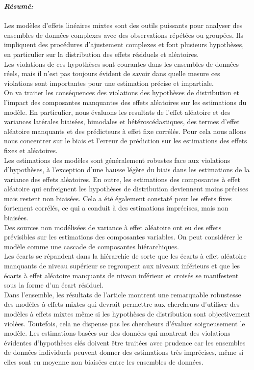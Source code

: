 \documentclass{article}
\begin{document}
\textbf{\textit{Résumé:}} \\  \\

Les modèles d'effets linéaires mixtes sont des outils puissants pour analyser des ensembles de données complexes avec des observations répétées ou groupées. Ils impliquent des procédures d'ajustement complexes et font plusieurs hypothèses, en particulier sur la distribution des effets résiduels et aléatoires. \\ 
 Les violations de ces hypothèses sont courantes dans les ensembles de données réels, mais il n'est pas toujours évident de savoir dans quelle mesure ces violations sont importantes pour une estimation précise et impartiale.\\
On va traiter les conséquences des violations des hypothèses de distribution et l'impact des composantes manquantes des effets aléatoires sur les estimations du modèle. En particulier, nous évaluons les resultats de l'effet aléatoire et des variances latérales biaisées, bimodales et hétéroscédastiques, des termes d'effet aléatoire manquants et des prédicteurs à effet fixe corrélés. Pour cela nous allons nous concentrer sur le biais et l'erreur de prédiction sur les estimations des effets fixes et aléatoires.\\ 

Les estimations des modèles sont généralement robustes face aux violations d'hypothèses, à l'exception d’une hausse légère du biais dans les estimations de la variance des effets aléatoires. En outre, les estimations des composantes à effet aléatoire qui enfreignent les hypothèses de distribution deviennent moins précises mais restent non biaisées. Cela a été également constaté pour les effets fixes fortement corrélés, ce qui a conduit à des estimations imprécises, mais non biaisées.\\

Des sources non modélisées de variance à effet aléatoire ont eu des effets prévisibles sur les estimations des composantes variables. On peut considérer le modèle comme une cascade de composantes hiérarchiques.\\

 Les écarts se répandent dans la hiérarchie de sorte que les écarts à effet aléatoire manquants de niveau supérieur se regroupent aux niveaux inférieurs et que les écarts à effet aléatoire manquants de niveau inférieur et croisés se manifestent sous la forme d'un écart résiduel.\\
Dans l'ensemble, les résultats de l’article montrent une remarquable robustesse des modèles à effets mixtes qui devrait permettre aux chercheurs d'utiliser des modèles à effets mixtes même si les hypothèses de distribution sont objectivement violées. Toutefois, cela ne dispense pas les chercheurs d'évaluer soigneusement le modèle. Les estimations basées sur des données qui montrent des violations évidentes d'hypothèses clés doivent être traitées avec prudence car les ensembles de données individuels peuvent donner des estimations très imprécises, même si elles sont en moyenne non biaisées entre les ensembles de données. \\ \\
\end{document}

